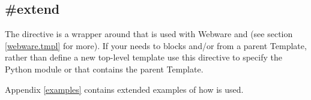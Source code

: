 \subsection{\#extend}
\label{directives.extend}

The  directive is a wrapper around
 that is used with Webware and {\bf
  } (see section \ref{webware.tmpl} for more). If your
 needs to  blocks and/or 
from a parent Template, rather than define a new top-level template use this
directive to specify the Python module or  that
contains the parent Template.


Appendix \ref{examples} contains extended examples of how  is
used.

